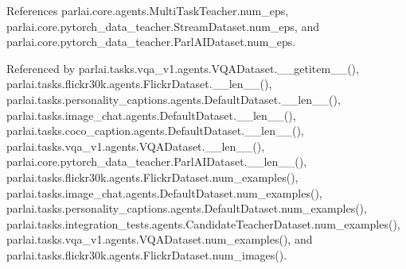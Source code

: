 References parlai.\+core.\+agents.\+Multi\+Task\+Teacher.\+num\+\_\+eps, parlai.\+core.\+pytorch\+\_\+data\+\_\+teacher.\+Stream\+Dataset.\+num\+\_\+eps, and parlai.\+core.\+pytorch\+\_\+data\+\_\+teacher.\+Parl\+A\+I\+Dataset.\+num\+\_\+eps.



Referenced by parlai.\+tasks.\+vqa\+\_\+v1.\+agents.\+V\+Q\+A\+Dataset.\+\_\+\+\_\+getitem\+\_\+\+\_\+(), parlai.\+tasks.\+flickr30k.\+agents.\+Flickr\+Dataset.\+\_\+\+\_\+len\+\_\+\+\_\+(), parlai.\+tasks.\+personality\+\_\+captions.\+agents.\+Default\+Dataset.\+\_\+\+\_\+len\+\_\+\+\_\+(), parlai.\+tasks.\+image\+\_\+chat.\+agents.\+Default\+Dataset.\+\_\+\+\_\+len\+\_\+\+\_\+(), parlai.\+tasks.\+coco\+\_\+caption.\+agents.\+Default\+Dataset.\+\_\+\+\_\+len\+\_\+\+\_\+(), parlai.\+tasks.\+vqa\+\_\+v1.\+agents.\+V\+Q\+A\+Dataset.\+\_\+\+\_\+len\+\_\+\+\_\+(), parlai.\+core.\+pytorch\+\_\+data\+\_\+teacher.\+Parl\+A\+I\+Dataset.\+\_\+\+\_\+len\+\_\+\+\_\+(), parlai.\+tasks.\+flickr30k.\+agents.\+Flickr\+Dataset.\+num\+\_\+examples(), parlai.\+tasks.\+image\+\_\+chat.\+agents.\+Default\+Dataset.\+num\+\_\+examples(), parlai.\+tasks.\+personality\+\_\+captions.\+agents.\+Default\+Dataset.\+num\+\_\+examples(), parlai.\+tasks.\+integration\+\_\+tests.\+agents.\+Candidate\+Teacher\+Dataset.\+num\+\_\+examples(), parlai.\+tasks.\+vqa\+\_\+v1.\+agents.\+V\+Q\+A\+Dataset.\+num\+\_\+examples(), and parlai.\+tasks.\+flickr30k.\+agents.\+Flickr\+Dataset.\+num\+\_\+images().

